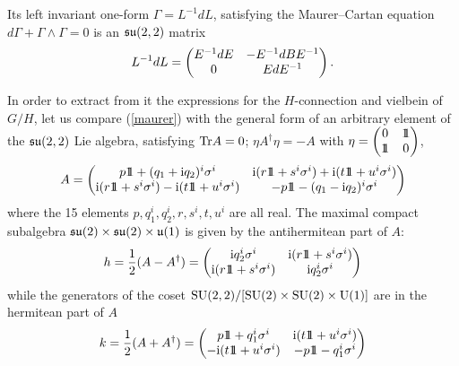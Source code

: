 \documentclass[a4paper,12pt]{article}
\begin{document}
Its left invariant one-form $\Gamma = L^{-1} dL $, satisfying the Maurer--Cartan equation
$d\Gamma + \Gamma \wedge \Gamma =0$  is an $\mathfrak{su}(2,2)$ matrix
\begin{equation}
L^{-1} dL = \begin{pmatrix}E^{-1} dE & -E^{-1}dBE^{-1} \cr 0 &EdE^{-1}\cr\end{pmatrix}. \label{maurer}
\end{equation}

In order to extract from it  the expressions for the $H$-connection and vielbein of $G/H$, let us compare 
 (\ref{maurer}) 
with the general form of an arbitrary element of the $\mathfrak{su}(2,2)$ Lie algebra, satisfying ${\rm Tr}A =0$; $\eta A^\dagger \eta = -A $
 with 
 $\eta = \begin{pmatrix}0 & \relax{\rm 1\kern-.35em 1} \cr \relax{\rm 1\kern-.35em 1} & 0\cr\end{pmatrix}$,
\begin{equation}
A=\begin{pmatrix} p \id + (q_1 + \ii q_2 )^i  \sigma^i & \ii (r \id + s^i \sigma^i) + \ii (t\id +u^i\sigma^i) \cr
 \ii (r\id + s^i \sigma^i) - \ii (t\id +u^i\sigma^i) & -p \id - (q_1 - \ii q_2 )^i\sigma^i \cr
\end{pmatrix}
\end{equation}
where the 15 elements $p,q^i_1, q^i_2, r,s^i, t, u^i$ are all real.
The maximal compact subalgebra $\mathfrak{su}(2)\times \mathfrak{su}(2)\times \mathfrak{u}(1)$ is given by the antihermitean part of $A$:
\begin{equation}
h=\frac 12 (A-A^\dagger) =\begin{pmatrix}  \mathrm{i} q_2^i  \sigma^i & \mathrm{i} (r \relax{\rm 1\kern-.35em 1} + s^i \sigma^i)  \cr
 \mathrm{i} (r\relax{\rm 1\kern-.35em 1} + s^i \sigma^i) &  \mathrm{i} q_2^i\sigma^i \cr
\end{pmatrix}
\end{equation}
while the generators of the coset $\mathrm{SU}(2,2)/[\mathrm{SU}(2)\times \mathrm{SU}(2) \times \mathrm{U}(1)]$ are in the hermitean part of $A$
\begin{equation}
k=\frac 12 (A+A^\dagger) =\begin{pmatrix}
p \relax{\rm 1\kern-.35em 1} + q_1^i  \sigma^i &  \mathrm{i} (t\relax{\rm 1\kern-.35em 1} +u^i\sigma^i) \cr
 - \mathrm{i} (t\relax{\rm 1\kern-.35em 1} +u^i\sigma^i) & -p \relax{\rm 1\kern-.35em 1} - q_1^i\sigma^i \cr
\end{pmatrix}
\end{equation}
\end{document}
